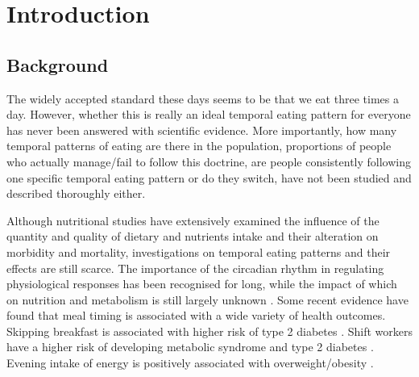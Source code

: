 
\chapter{Introduction} %

\label{Chapter 1} %


\newcommand{\keyword}[1]{\textbf{#1}}
\newcommand{\tabhead}[1]{\textbf{#1}}
\newcommand{\code}[1]{\texttt{#1}}
\newcommand{\file}[1]{\texttt{\bfseries#1}}
\newcommand{\option}[1]{\texttt{\itshape#1}}


\section{Background}\vspace{-0.3cm}

The widely accepted standard these days seems to be that we eat three times a day. However, whether this is really an ideal temporal eating pattern for everyone has never been answered with scientific evidence. More importantly, how many temporal patterns of eating are there in the population, proportions of people who actually manage/fail to follow this doctrine, are people consistently following one specific temporal eating pattern or do they switch, have not been studied and described thoroughly either. 

Although nutritional studies have extensively examined the influence of the quantity and quality of dietary and nutrients intake and their alteration on morbidity and mortality, investigations on temporal eating patterns and their effects are still scarce. The importance of the circadian rhythm in regulating physiological responses has been recognised for long, while the impact of which on nutrition and metabolism is still largely unknown \parencite{johnston2014physiological, garaulet2014timing, asher2015time}. Some recent evidence have found that meal timing is associated with a wide variety of health outcomes. Skipping breakfast is associated with higher risk of type 2 diabetes \parencite{uemura2015breakfast}. Shift workers have a higher risk of developing metabolic syndrome \parencite{de2009rotating} and type 2 diabetes \parencite{pan2011rotating}. Evening intake of energy is positively associated with overweight/obesity \parencite{almoosawi2016chrono}. 

